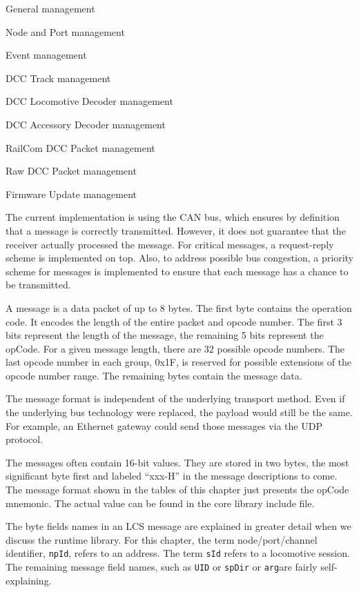 \begin{smallGapItemize}
    \item General management
    \item Node and Port management
    \item Event management
    \item DCC Track management
    \item DCC Locomotive Decoder management
    \item DCC Accessory Decoder management
    \item RailCom DCC Packet management
    \item Raw DCC Packet management
    \item Firmware Update management
\end{smallGapItemize}

The current implementation is using the CAN bus, which ensures by definition that a message is correctly transmitted. However, it does not guarantee that the receiver actually processed the message. For critical messages, a request-reply scheme is implemented on top. Also, to address possible bus congestion, a priority scheme for messages is implemented to ensure that each message has a chance to be transmitted.

A message is a data packet of up to 8 bytes. The first byte contains the operation code. It encodes the length of the entire packet and opcode number. The first 3 bits represent the length of the message, the remaining 5 bits represent the opCode. For a given message length, there are 32 possible opcode numbers. The last opcode number in each group, 0x1F, is reserved for possible extensions of the opcode number range. The remaining bytes contain the message data. 

The message format is independent of the underlying transport method. Even if the underlying bus technology were replaced, the payload would still be the same. For example, an Ethernet gateway could send those messages via the UDP protocol. 

The messages often contain 16-bit values. They are stored in two bytes, the most significant byte first and labeled ``xxx-H'' in the message descriptions to come. The message format shown in the tables of this chapter just presents the opCode mnemonic. The actual value can be found in the core library include file.

The byte fields names in an LCS message are explained in greater detail when we discuss the runtime library. For this chapter, the term node/port/channel identifier, \texttt{npId}, refers to an address. The term \texttt{sId} refers to a locomotive session. The remaining message field names, such as \texttt{UID} or \texttt{spDir} or \texttt{arg}are fairly self-explaining.

